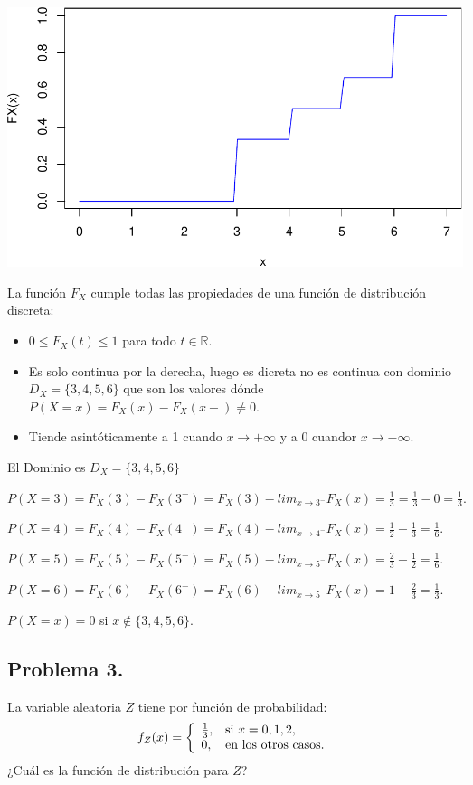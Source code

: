 \documentclass[
]{article}
\providecommand{\tightlist}{%
  \setlength{\itemsep}{0pt}\setlength{\parskip}{0pt}}
\begin{document}
\includegraphics{Tema-2---Variables-Aleatorias_parte1_discretas_Soluciones_files/figure-latex/unnamed-chunk-2-1.pdf}

La función \(F_X\) cumple todas las propiedades de una función de
distribución discreta:

\begin{itemize}
\tightlist
\item
  \(0\leq F_X(t)\leq 1\) para todo \(t\in \mathbb{R}.\)
\item
  Es solo continua por la derecha, luego es dicreta no es continua con
  dominio \(D_X=\{3,4,5,6\}\) que son los valores dónde
  \(P(X=x)=F_X(x)-F_X(x-)\not=0\).
\item
  Tiende asintóticamente a 1 cuando \(x\to+\infty\) y a 0 cuandor
  \(x\to-\infty\).
\end{itemize}

El Dominio es \(D_X=\{3,4,5,6\}\)

\(P(X=3)=F_X(3)-F_X(3^{-})=F_X(3)-lim_{x\to 3^{-}} F_X(x)=\frac{1}{3}=\frac{1}{3}-0=\frac{1}{3}.\)

\(P(X=4)=F_X(4)-F_X(4^{-})=F_X(4)-lim_{x\to 4^{-}} F_X(x)=\frac{1}{2}-\frac{1}{3}=\frac{1}{6}.\)

\(P(X=5)=F_X(5)-F_X(5^{-})=F_X(5)-lim_{x\to 5^{-}} F_X(x)=\frac{2}{3}-\frac{1}{2}=\frac{1}{6}.\)

\(P(X=6)=F_X(6)-F_X(6^{-})=F_X(6)-lim_{x\to 5^{-}} F_X(x)=1-\frac{2}{3}=\frac{1}{3}.\)

\(P(X=x)=0\) si \(x \not\in\{3,4,5,6\}.\)

\hypertarget{problema-3.}{%
\subsection{Problema 3.}\label{problema-3.}}

La variable aleatoria \(Z\) tiene por función de probabilidad:
\[f_Z (x)=
\left\{\begin{array}{ll}
{1\over 3}, & \mbox{si $x=0,1,2$},\\ 0, & \mbox{en los otros
casos.}
\end{array}\right.
\] ¿Cuál es la función de distribución para \(Z\)?
\end{document}
